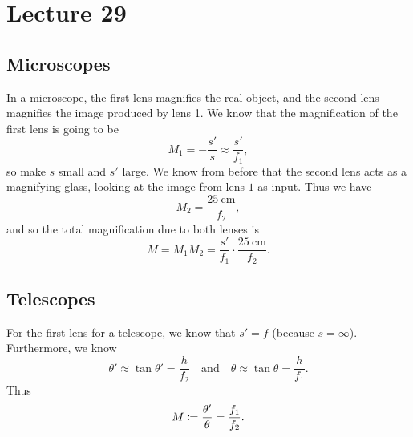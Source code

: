 \documentclass[class=article, crop=false]{standalone}
\begin{document}
  \section{Lecture 29}
  \subsection{Microscopes}
  In a microscope, the first lens magnifies the real object, and the second lens magnifies the image produced by lens 1. We know that the magnification of the first lens is going to be
  \[
    M_1 = -\frac{s'}{s} \approx \frac{s'}{f_1},
  \]
  so make $s$ small and $s'$ large. We know from before that the second lens acts as a magnifying glass, looking at the image from lens $1$ as input. Thus we have
  \[
    M_2 = \frac{25\ \mathrm{cm}}{f_2},
  \]
  and so the total magnification due to both lenses is
  \[
    M = M_1M_2 = \frac{s'}{f_1}\cdot \frac{25\ \mathrm{cm}}{f_2}.
  \]
  \subsection{Telescopes}
  For the first lens for a telescope, we know that $s' = f$ (because $s = \infty$). Furthermore, we know
  \[
    \theta'\approx \tan\theta' = \frac{h}{f_2} \quad\text{and}\quad \theta\approx \tan\theta = \frac{h}{f_1}.
  \]
  Thus
  \[
    M\coloneqq \frac{\theta'}{\theta} = \frac{f_1}{f_2}.
  \]
\end{document}
